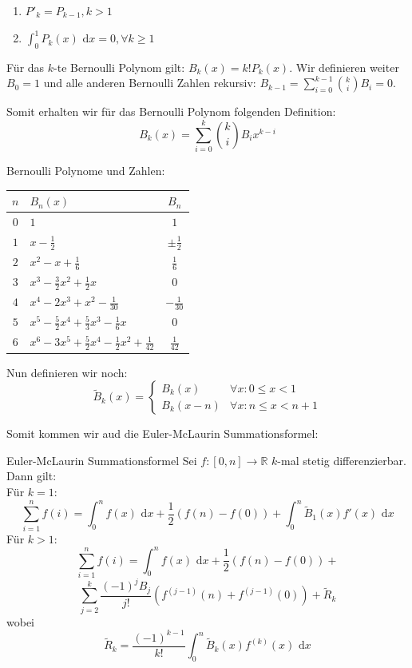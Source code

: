 \documentclass[a4paper,8pt]{extarticle}
\def\R{\mathbb{R}}
\def\dx{\text{ d}x}
\begin{document}
\begin{enumerate}
  \item $P'_k = P_{k-1}, k > 1$
  \item $\int_0^1 P_k(x)\dx = 0, \forall k \geq 1$
\end{enumerate}

Für das $k$-te Bernoulli Polynom gilt: $B_k(x) = k!P_k(x)$. Wir definieren weiter $B_0=1$ und alle anderen Bernoulli Zahlen rekursiv: $B_{k-1} = \sum_{i=0}^{k-1}{k \choose i}B_i = 0$.

Somit erhalten wir für das Bernoulli Polynom folgenden Definition: $$B_k(x) = \sum_{i=0}^{k}{k \choose i}B_ix^{k-i}$$

Bernoulli Polynome und Zahlen:
\begin{center}
\begin{tabular}{c|lc}
  $n$ & $B_n(x)$ & $B_n$ \\
  \hline
  $0$ & $1$ & $1$\\
  $1$ & $x-\frac{1}{2}$ & $\pm \frac{1}{2}$ \\
  $2$ & $x^2-x+\frac{1}{6}$ & $\frac{1}{6}$ \\
  $3$ & $x^3-\frac{3}{2}x^2+\frac{1}{2}x$ & $0$ \\
  $4$ & $x^4-2x^3+x^2-\frac{1}{30}$ & $-\frac{1}{30}$\\
  $5$ & $x^5-\frac{5}{2}x^4+\frac{5}{3}x^3-\frac{1}{6}x$ & $0$\\
  $6$ & $x^6-3x^5+\frac{5}{2}x^4-\frac{1}{2}x^2+\frac{1}{42}$ & $\frac{1}{42}$\\
\end{tabular}
\end{center}
Nun definieren wir noch: $$\tilde{B}_k(x) = \begin{cases}
  B_k(x) & \forall x: 0 \leq x < 1 \\
  B_k(x-n) & \forall x: n \leq x < n + 1
\end{cases}$$

Somit kommen wir aud die Euler-McLaurin Summationsformel:
\begin{mainbox}{Euler-McLaurin Summationsformel}
  Sei $f: [0, n] \to \R$ $k$-mal stetig differenzierbar. Dann gilt: \\
  Für $k = 1$:
  $$\sum_{i = 1}^n f(i) = \int_0^n f(x) \dx + \frac{1}{2}(f(n) - f(0)) + \int_0^n \tilde{B}_1(x)f'(x)\dx$$
  Für $k>1$:
  $$\sum_{i = 1}^n f(i) = \int_0^n f(x) \dx + \frac{1}{2}(f(n) - f(0))+$$
  $$\sum_{j = 2}^k \frac{(-1)^j B_j}{j!}(f^{(j-1)}(n) + f^{(j-1)}(0)) + \tilde{R}_k$$
  wobei
  $$ \tilde{R}_k = \frac{(-1)^{k-1}}{k!} \int_0^n \tilde{B}_k(x)f^{(k)}(x)\dx$$
\end{mainbox}
\end{document}
